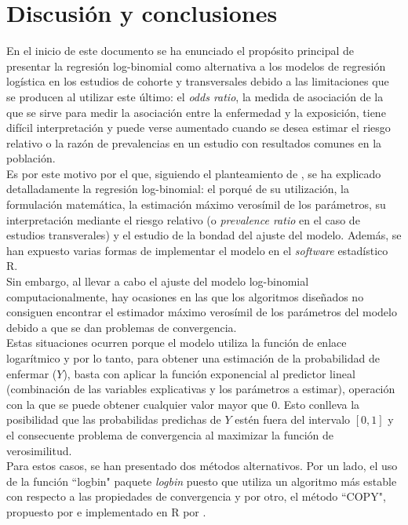 \chapter{Discusión y conclusiones}

En el inicio de este documento se ha enunciado el propósito principal de presentar la regresión log-binomial como alternativa a los modelos de regresión logística en los estudios de cohorte y transversales debido a las limitaciones que se producen al utilizar este último: el \textit{odds ratio}, la medida de asociación de la que se sirve para medir la asociación entre la enfermedad y la exposición, tiene difícil interpretación y puede verse aumentado cuando se desea estimar el riesgo relativo o la razón de prevalencias en un estudio con resultados comunes en la población.\\

Es por este motivo por el que, siguiendo el planteamiento de \textcite{logbinom1}, se ha explicado detalladamente la regresión log-binomial: el porqué de su utilización, la formulación matemática, la estimación máximo verosímil de los parámetros, su interpretación mediante el riesgo relativo (o \textit{prevalence ratio} en el caso de estudios transverales) y el estudio de la bondad del ajuste del modelo. Además, se han expuesto varias formas de implementar el modelo en el \textit{software} estadístico R.\\

Sin embargo, al llevar a cabo el ajuste del modelo log-binomial computacionalmente, hay ocasiones en las que los algoritmos diseñados no consiguen encontrar el estimador máximo verosímil de los parámetros del modelo debido a que se dan problemas de convergencia.\\

Estas situaciones ocurren porque el modelo utiliza la función de enlace logarítmico y por lo tanto, para obtener una estimación de la probabilidad de enfermar ($Y$), basta con aplicar la función exponencial al predictor lineal (combinación de las variables explicativas y los parámetros a estimar), operación con la que se puede obtener cualquier valor mayor que 0. Esto conlleva la posibilidad que las probabilidas predichas de $Y$ estén fuera del intervalo $[0,1]$ y el consecuente problema de convergencia al maximizar la función de verosimilitud.\\

Para estos casos, se han presentado dos métodos alternativos. Por un lado, el uso de la función ``logbin"  paquete \textit{logbin} \autocite{logbinR} puesto que utiliza un algoritmo más estable con respecto a las propiedades de convergencia y por otro, el método ``COPY", propuesto por \textcite{COPY} e implementado en R por \textcite{Silvia}.\\

